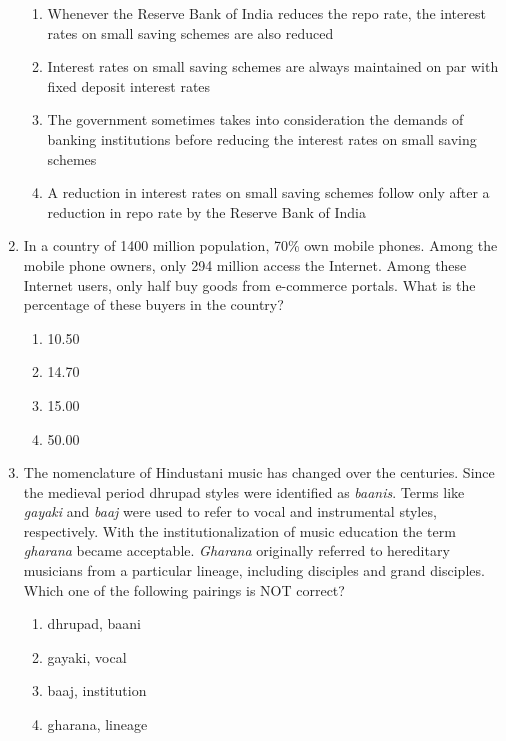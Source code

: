 \documentclass[journal,12pt,onecolumn]{IEEEtran}
\theoremstyle{remark}
\begin{document}
\begin{enumerate}[resume]
\begin{enumerate}
\item Whenever the Reserve Bank of India reduces the repo rate, the interest rates on small saving schemes are also reduced  
\item Interest rates on small saving schemes are always maintained on par with fixed deposit interest rates  
\item The government sometimes takes into consideration the demands of banking institutions before reducing the interest rates on small saving schemes  
\item A reduction in interest rates on small saving schemes follow only after a reduction in repo rate by the Reserve Bank of India  
\end{enumerate}

\item In a country of 1400 million population, 70\% own mobile phones. Among the mobile phone owners, only 294 million access the Internet. Among these Internet users, only half buy goods from e-commerce portals. What is the percentage of these buyers in the country?

\begin{multicols}{4}
\begin{enumerate}
\item 10.50  
\item 14.70  
\item 15.00  
\item 50.00  
\end{enumerate}
\end{multicols}

\item The nomenclature of Hindustani music has changed over the centuries. Since the medieval period dhrupad styles were identified as \textit{baanis}. Terms like \textit{gayaki} and \textit{baaj} were used to refer to vocal and instrumental styles, respectively. With the institutionalization of music education the term \textit{gharana} became acceptable. \textit{Gharana} originally referred to hereditary musicians from a particular lineage, including disciples and grand disciples.  
Which one of the following pairings is NOT correct?

\begin{enumerate}
\item dhrupad, baani  
\item gayaki, vocal  
\item baaj, institution  
\item gharana, lineage  
\end{enumerate}


\end{enumerate}
\end{document}
